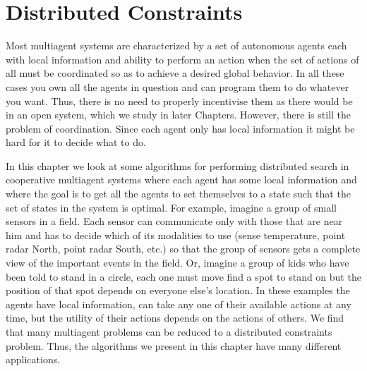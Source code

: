 \chapter{Distributed Constraints}
\label{ch:dconstraints}



\newcommand{\graphgrid}[1]{%
  \draw #1 -- +(1.5,0) 
  +(0,.5) -- +(1.5,.5)
  +(0,1) -- +(1.5,1)
  +(0,1.5) -- +(1.5,1.5)
  +(0,0) -- +(0,1.5)
  +(.5,0) -- +(.5,1.5)
  +(1,0) -- +(1,1.5)
  +(1.5,0) -- +(1.5,1.5)
  +(0,0) node[above left] {$x_3$}
  +(0,.5) node[above left] {$x_2$}
  +(0,1) node[above left] {$x_1$}
  +(.25,1.75) node {\medbullet}
  +(.75,1.75) node {\textcolor{gray}{\medbullet}}
  +(1.25,1.75) node {$\medcirc$};
}

\newcommand{\drawxat}[4]{%
  \draw (.5cm*#3+#1cm,.5cm*#4+#2cm) -- +(.5,.5)
  +(.5,0) -- +(0,.5);}

\newcommand{\drawxatred}[4]{%
  \draw[gray] (.5cm*#3+#1cm,.5cm*#4+#2cm) -- +(.5,.5)
  +(.5,0) -- +(0,.5);}

\newcommand{\tc}[1]{%
  \textcolor{#1}{\medbullet}}

Most multiagent systems are characterized by a set of autonomous
agents each with local information and ability to perform an action
when the set of actions of all must be coordinated so as to achieve a
desired global behavior. In all these cases you own all the agents in
question and can program them to do whatever you want. Thus, there is
no need to properly incentivise them as there would be in an open
system, which we study in later Chapters. However, there is still the
problem of coordination. Since each agent only has local information
it might be hard for it to decide what to do.

In this chapter we look at some algorithms for performing distributed
search in cooperative multiagent systems where each agent has some
local information and where the goal is to get all the agents to set
themselves to a state such that the set of states in the system is
optimal. For example, imagine a group of small sensors in a field.
Each sensor can communicate only with those that are near him and has
to decide which of its modalities to use (sense temperature, point
radar North, point radar South, etc.) so that the group of sensors
gets a complete view of the important events in the field. Or, imagine
a group of kids who have been told to stand in a circle, each one must
move find a spot to stand on but the position of that spot depends on
everyone else's location. In these examples the agents have local
information, can take any one of their available actions at any time,
but the utility of their actions depends on the actions of others. We
find that many multiagent problems can be reduced to a distributed
constraints problem. Thus, the algorithms we present in this chapter
have many different applications.


